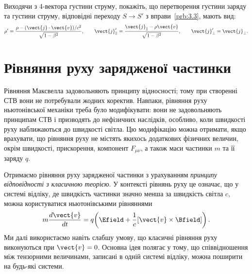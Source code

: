 \begin{problem}
    Виходячи з 4-вектора густини струму, покажіть, що перетворення густини заряду та густини струму, відповідні переходу
    $S\to S'$ з вправи~\ref{prb:3.3}, мають вид:
    \begin{equation*}
        \rho' = \frac{\rho - (\vect{j}\cdot\vect{v})/c^2}{\sqrt{1-\beta^2}},
        \qquad
        \vect{j}'_{\|} = \frac{\vect{j}_{\|} - \rho\vect{v}}{\sqrt{1-\beta^2}},
        \qquad
        \vect{j}'_{\bot} = \vect{j}_{\bot}.
    \end{equation*}
\end{problem}

\section{Рівняння руху зарядженої частинки}

Рівняння Максвелла задовольняють принципу відносності; тому при створенні СТВ вони не потребували жодних коректив.
Навпаки, рівняння руху ньютонівської механіки треба було модифікувати: вони не задовольняють принципам СТВ і призводять
до нефізичних наслідків, особливо, коли швидкості руху наближаються до швидкості світла. Цю модифікацію можна отримати,
якщо врахувати, що рівняння руху не містять якихось додаткових фізичних величин, окрім швидкості, прискорення, компонент
$F_{\mu\nu}$, а також маси частинки $m$ та її заряду $q$.

Отримаємо рівняння руху зарядженої частинки з урахуванням \emph{принципу відповідності з класичною теорією}. У контексті
рівнянь руху це означає, що у системі відліку, де швидкість частинки значно менша за швидкість світла $c$, можна
користуватися ньютонівськими рівняннями
\begin{equation*}
    m\frac{d\vect{v}}{dt} = q\!\left(\Efield
    + \frac{1}{c}[\vect{v}\times\Bfield]\right).
\end{equation*}
Ми далі використаємо навіть слабшу умову, що класичні рівняння руху виконуються при $\vect{v}=0$. Основна ідея полягає у
тому, що співвідношення між тензорними величинами, записані в одній системі відліку, можна поширити на будь-які системи.

